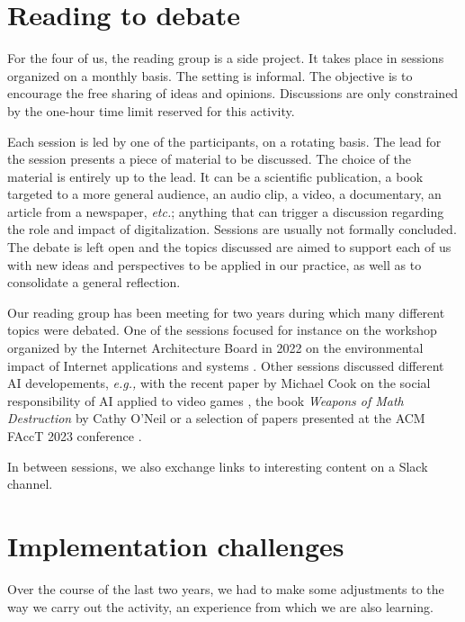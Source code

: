 \documentclass[journal]{IEEEtran}
\begin{document}
\section{Reading to debate}

For the four of us, the reading group is a side project. It takes place in
sessions organized on a monthly basis. The setting is informal. The objective
is to encourage the free sharing of ideas and opinions. Discussions are
only constrained by the one-hour time limit reserved for this activity.

Each  session  is led  by  one  of  the  participants, on  a  rotating
basis. The  lead for the  session presents a  piece of material  to be
discussed. The choice  of the material is entirely up  to the lead. It
can be  a scientific publication,  a book  targeted to a  more general
audience,  an audio clip, a video,  a documentary,  an  article from  a
newspaper, \textit{etc.}; anything that can  trigger a discussion regarding the
role and impact  of digitalization. Sessions are  usually not formally
concluded. The debate is left open  and the topics discussed are aimed
to support each of us with new ideas and perspectives to be applied in
our practice, as well as to consolidate a general reflection.

Our reading  group has been  meeting for  two years during  which many
different topics  were debated. One  of the sessions focused for instance
on the workshop organized   by  the   Internet Architecture Board in 2022
on the environmental  impact of Internet   applications  and   systems \cite{IAB22}.
Other sessions discussed different AI developements, \textit{e.g.,} with the recent
paper by Michael  Cook on the social responsibility of AI applied to video games \cite{Cook21},
the  book \textit{Weapons  of  Math Destruction} by  Cathy O’Neil  \cite{WMD16} or  a selection  of papers
presented at the ACM FAccT 2023 conference \cite{bell2023_fairness,karan2023_differential_pricing,lucaj2023_ai_regulation,rao2023_facebook_discrimination}.

In between sessions, we also  exchange links to interesting content on
a Slack channel.

\section{Implementation challenges}

Over the course of the last two years, we had to make some adjustments
to the way we carry out the  activity, an experience from which we are
also learning.
\end{document}
